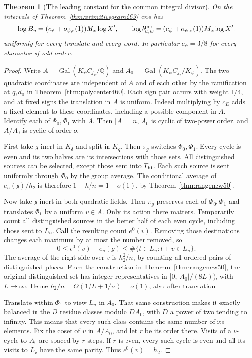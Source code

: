 \documentclass[a4paper,11pt]{article}
\newtheorem{theorem}[proposition]{Theorem}
\theoremstyle{definition}
\theoremstyle{remark}
\numberwithin{equation}{section}
\begin{document}
\begin{theorem}[The leading constant for the common integral divisor]\leavevmode
\label{thm:divconstant513}
On the intervals of Theorem~\ref{thm:primitivegram463} one has
\[
    \log B_u=(c_\psi+o_{\psi,\varepsilon}(1))M_x\log X',
    \qquad
    \log b^{\rm per}_{u,w}
             =(c_\psi+o_{\psi,\varepsilon}(1))M_x\log X',
\]
uniformly for every translate and every word. In particular
\(c_\psi=3/8\) for every character of odd order.
\end{theorem}
\begin{proof}
Write \(A=\operatorname{Gal}(K_\psi C_{j_x}/\mathbb Q)\) and
\(A_0=\operatorname{Gal}(K_\psi C_{j_x}/K_\psi)\). The two
quadratic coordinates are independent of \(A\) and of each
other by the ramification at \(q,d_0\) in
Theorem~\ref{thm:polycenter460}. Each sign pair occurs with
weight \(1/4\), and at fixed signs the translation in \(A\)
is uniform. Indeed multiplying by \(c_E\) adds a fixed element
to these coordinates, including a possible component in \(A\).
Identify each of \(\Phi_0,\Phi_1\) with \(A\). Then
\(|A|=n\), \(A_0\) is cyclic of two-power order, and \(A/A_0\)
is cyclic of order \(o\).

First take \(g\) inert in \(K_d\) and split in \(K_q\).
Then \(\pi_g\) switches \(\Phi_0,\Phi_1\).
Every cycle is even and its two halves are its intersections
with those sets. All distinguished sources can be selected,
except those sent into \(T_{\rm hi}\). Each such source is
sent uniformly through \(\Phi_0\) by the group average.
The conditional average of \(e_u(g)/h_2\) is therefore
\(1-h/n=1-o(1)\), by Theorem~\ref{thm:rangenew50}.

Now take \(g\) inert in both quadratic fields. Then \(\pi_g\)
preserves each of \(\Phi_0,\Phi_1\) and translates \(\Phi_1\)
by a uniform \(v\in A\). Only its action there matters.
Temporarily count all distinguished sources in the better
half of each even cycle, including those sent to \(L_u\).
Call the resulting count \(e^0(v)\). Removing those destinations
changes each maximum by at most the number removed, so
\[
      0\le e^0(v)-e_u(g)\le\#\{t\in L_u:t+v\in L_u\}.
\]
The average of the right side over \(v\) is \(h_2^2/n\), by
counting all ordered pairs of distinguished places. From the
construction in Theorem~\ref{thm:rangenew50}, the original
distinguished set has integer representatives in
\([0,|A_0|/(8L))\), with \(L\to\infty\). Hence
\(h_2/n=O(1/L+1/n)=o(1)\), also after translation.

Translate within \(\Phi_1\) to view \(L_u\) in \(A_0\).
That same construction makes it exactly balanced in the
\(D\) residue classes modulo \(D A_0\), with \(D\) a power
of two tending to infinity. This means that every such class
contains the same number of its elements. Fix the coset of
\(v\) in \(A/A_0\), and let \(r\) be its order there. Visits of
a \(v\)-cycle to \(A_0\) are spaced by \(r\) steps. If \(r\)
is even, every such cycle is even and all its visits to
\(L_u\) have the same parity. Thus \(e^0(v)=h_2\).


\end{proof}
\end{document}
